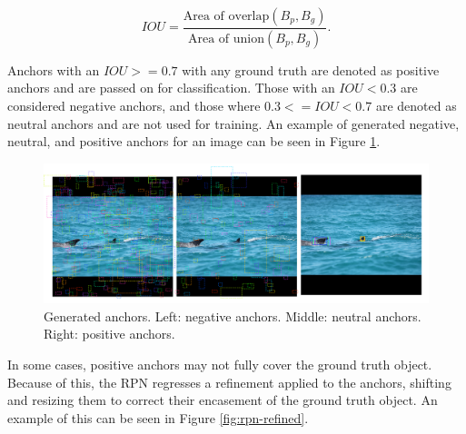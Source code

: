 \begin{equation}
IOU = \frac{\text{Area of overlap}(B_p, B_g)}{\text{Area of union}(B_p, B_g)}.
\end{equation}

Anchors with an $IOU >= 0.7$ with any ground truth are denoted as positive anchors and are passed on for classification. Those with an $IOU < 0.3$ are considered negative anchors, and those where $0.3 <= IOU < 0.7$ are denoted as neutral anchors and are not used for training. An example of generated negative, neutral, and positive anchors for an image can be seen in Figure \ref{fig:anchor-types}.

\begin{figure}
	\begin{center}
		\includegraphics[scale=0.25]{Chapter2/figs/anchor-types.png}
	\end{center}
	\caption{Generated anchors. Left: negative anchors. Middle: neutral anchors. Right: positive anchors.}
	\label{fig:anchor-types}
\end{figure}

In some cases, positive anchors may not fully cover the ground truth object. Because of this, the RPN regresses a refinement applied to the anchors, shifting and resizing them to correct their encasement of the ground truth object. An example of this can be seen in Figure \ref{fig:rpn-refined}.

